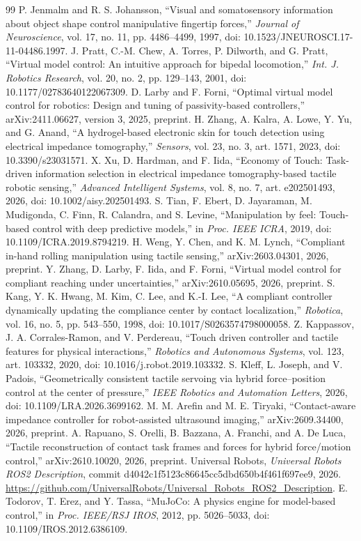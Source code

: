 \documentclass[letterpaper,10pt,conference]{IEEEtran}
\begin{document}
\begin{thebibliography}{99}
 P. Jenmalm and R. S. Johansson, ``Visual and somatosensory information about object shape control manipulative fingertip forces,'' \emph{Journal of Neuroscience}, vol. 17, no. 11, pp. 4486--4499, 1997, doi: 10.1523/JNEUROSCI.17-11-04486.1997.
 J. Pratt, C.-M. Chew, A. Torres, P. Dilworth, and G. Pratt, ``Virtual model control: An intuitive approach for bipedal locomotion,'' \emph{Int. J. Robotics Research}, vol. 20, no. 2, pp. 129--143, 2001, doi: 10.1177/02783640122067309.
 D. Larby and F. Forni, ``Optimal virtual model control for robotics: Design and tuning of passivity-based controllers,'' arXiv:2411.06627, version 3, 2025, preprint.
 H. Zhang, A. Kalra, A. Lowe, Y. Yu, and G. Anand, ``A hydrogel-based electronic skin for touch detection using electrical impedance tomography,'' \emph{Sensors}, vol. 23, no. 3, art. 1571, 2023, doi: 10.3390/s23031571.
 X. Xu, D. Hardman, and F. Iida, ``Economy of Touch: Task-driven information selection in electrical impedance tomography-based tactile robotic sensing,'' \emph{Advanced Intelligent Systems}, vol. 8, no. 7, art. e202501493, 2026, doi: 10.1002/aisy.202501493.
 S. Tian, F. Ebert, D. Jayaraman, M. Mudigonda, C. Finn, R. Calandra, and S. Levine, ``Manipulation by feel: Touch-based control with deep predictive models,'' in \emph{Proc. IEEE ICRA}, 2019, doi: 10.1109/ICRA.2019.8794219.
 H. Weng, Y. Chen, and K. M. Lynch, ``Compliant in-hand rolling manipulation using tactile sensing,'' arXiv:2603.04301, 2026, preprint.
 Y. Zhang, D. Larby, F. Iida, and F. Forni, ``Virtual model control for compliant reaching under uncertainties,'' arXiv:2610.05695, 2026, preprint.
 S. Kang, Y. K. Hwang, M. Kim, C. Lee, and K.-I. Lee, ``A compliant controller dynamically updating the compliance center by contact localization,'' \emph{Robotica}, vol. 16, no. 5, pp. 543--550, 1998, doi: 10.1017/S0263574798000058.
 Z. Kappassov, J. A. Corrales-Ramon, and V. Perdereau, ``Touch driven controller and tactile features for physical interactions,'' \emph{Robotics and Autonomous Systems}, vol. 123, art. 103332, 2020, doi: 10.1016/j.robot.2019.103332.
 S. Kleff, L. Joseph, and V. Padois, ``Geometrically consistent tactile servoing via hybrid force--position control at the center of pressure,'' \emph{IEEE Robotics and Automation Letters}, 2026, doi: 10.1109/LRA.2026.3699162.
 M. M. Arefin and M. E. Tiryaki, ``Contact-aware impedance controller for robot-assisted ultrasound imaging,'' arXiv:2609.34400, 2026, preprint.
 A. Rapuano, S. Orelli, B. Bazzana, A. Franchi, and A. De Luca, ``Tactile reconstruction of contact task frames and forces for hybrid force/motion control,'' arXiv:2610.10020, 2026, preprint.
 Universal Robots, \emph{Universal Robots ROS2 Description}, commit d4042c1f5123c86645cc5dbd650b4f461f697ee9, 2026. \url{https://github.com/UniversalRobots/Universal_Robots_ROS2_Description}.
 E. Todorov, T. Erez, and Y. Tassa, ``MuJoCo: A physics engine for model-based control,'' in \emph{Proc. IEEE/RSJ IROS}, 2012, pp. 5026--5033, doi: 10.1109/IROS.2012.6386109.
\end{thebibliography}
\end{document}
